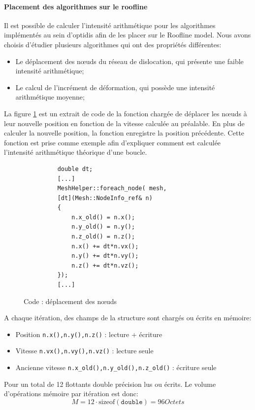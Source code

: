 \paragraph{Placement des algorithmes sur le roofline}

Il est possible de calculer l'intensité arithmétique pour les algorithmes implémentés au sein d'optidis afin de les placer sur le Roofline model. Nous avons choisis d'étudier plusieurs algorithmes qui ont des propriétés différentes:
\begin{itemize}
    \item Le déplacement des nœuds du réseau de dislocation, qui présente une faible intensité arithmétique;
    \item Le calcul de l'incrément de déformation, qui possède une intensité arithmétique moyenne;
\end{itemize}

La figure \ref{fig:movenodes} est un extrait de code de la fonction chargée de déplacer les nœuds à leur nouvelle position en fonction de la vitesse calculée au préalable. En plus de calculer la nouvelle position, la fonction enregistre la position précédente. Cette fonction est prise comme exemple afin d'expliquer comment est calculée l'intensité arithmétique théorique d'une boucle. 

\begin{figure}
    \centering
    \begin{subfigure}[b]{0.47\textwidth}
        \centering
        \begin{verbatim}
    double dt;
    [...]
    MeshHelper::foreach_node( mesh, 
    [dt](Mesh::NodeInfo_ref& n)
    {
        n.x_old() = n.x();
        n.y_old() = n.y();
        n.z_old() = n.z();
        n.x() += dt*n.vx();
        n.y() += dt*n.vy();
        n.z() += dt*n.vz();
    });
    [...]
        \end{verbatim}
    \end{subfigure}
    \caption{Code : déplacement des nœuds}
    \label{fig:movenodes}
\end{figure}

A chaque itération, des champs de la structure sont chargés ou écrits en mémoire:
\begin{itemize}
    \item Position \texttt{{n.x(),n.y(),n.z()}} : lecture + écriture
    \item Vitesse \texttt{{n.vx(),n.vy(),n.vz()}} : lecture seule
    \item Ancienne vitesse \texttt{{n.x_old(),n.y_old(),n.z_old()}} : écriture seule
\end{itemize}
Pour un total de 12 flottants double précision lus ou écrits. Le volume d'opérations mémoire par itération est donc:
\begin{equation}
    M = 12 \cdot \text{sizeof}(\texttt{double}) = \unit{96}{Octets}
\end{equation}

